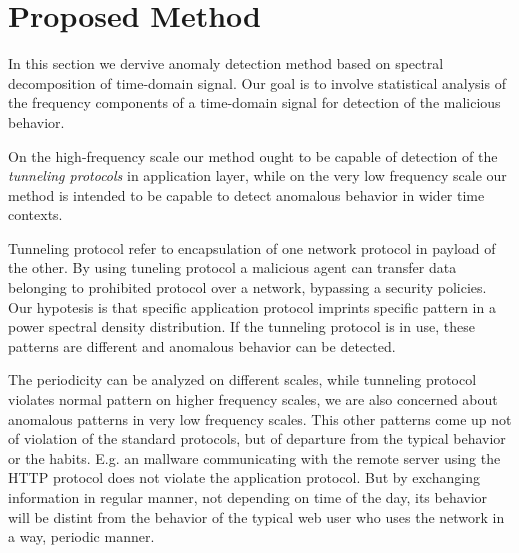 
\chapter{Proposed Method}

In this section we dervive anomaly detection method based on spectral decomposition
of time-domain signal.
Our goal is to involve statistical analysis of the frequency components of a 
time-domain signal for detection of the malicious behavior.

On the high-frequency scale our method ought to be capable of detection of the
\emph{tunneling protocols} in application layer, while on the very low frequency scale
our method is intended to be capable to detect anomalous behavior in wider time contexts.

Tunneling protocol refer to encapsulation of one network 
protocol in payload of the other. By using tuneling protocol a malicious agent can 
transfer data  belonging to prohibited protocol over a network, bypassing 
a security policies. Our hypotesis is that specific application protocol imprints 
specific pattern in a power spectral density distribution. If the tunneling protocol 
is in use, these patterns are different and anomalous behavior can be detected.

The periodicity can be analyzed on different scales, while tunneling protocol
violates normal pattern on higher frequency scales, we are also concerned about anomalous
patterns in very low frequency scales. This other patterns come up not of violation 
of the standard protocols, but of departure from the typical behavior or the habits. 
E.g. an mallware communicating with the remote server using the HTTP protocol 
does not violate the application protocol. 
But by exchanging information in regular manner, not depending on time of the day,
its behavior will be distint from the behavior of the typical web user who uses the network
in a way, periodic manner.

